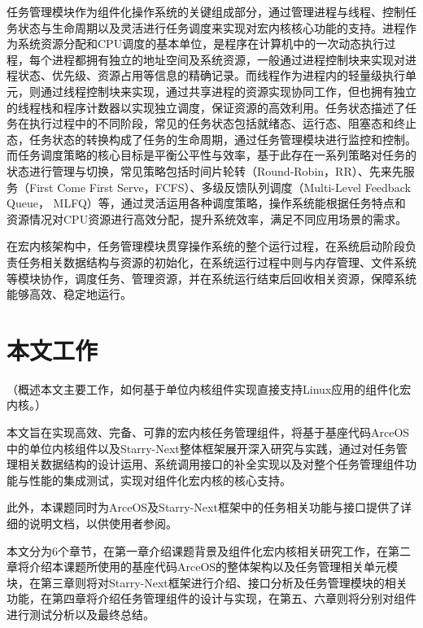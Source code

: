 任务管理模块作为组件化操作系统的关键组成部分，通过管理进程与线程、控制任务状态与生命周期以及灵活进行任务调度来实现对宏内核核心功能的支持。进程作为系统资源分配和CPU调度的基本单位，是程序在计算机中的一次动态执行过程，每个进程都拥有独立的地址空间及系统资源，一般通过进程控制块来实现对进程状态、优先级、资源占用等信息的精确记录。而线程作为进程内的轻量级执行单元，则通过线程控制块来实现，通过共享进程的资源实现协同工作，但也拥有独立的线程栈和程序计数器以实现独立调度，保证资源的高效利用。任务状态描述了任务在执行过程中的不同阶段，常见的任务状态包括就绪态、运行态、阻塞态和终止态，任务状态的转换构成了任务的生命周期，通过任务管理模块进行监控和控制。而任务调度策略的核心目标是平衡公平性与效率，基于此存在一系列策略对任务的状态进行管理与切换，常见策略包括时间片轮转（Round-Robin，RR）、先来先服务（First Come First Serve，FCFS）、多级反馈队列调度（Multi-Level Feedback Queue， MLFQ）等，通过灵活运用各种调度策略，操作系统能根据任务特点和资源情况对CPU资源进行高效分配，提升系统效率，满足不同应用场景的需求。

在宏内核架构中，任务管理模块贯穿操作系统的整个运行过程，在系统启动阶段负责任务相关数据结构与资源的初始化，在系统运行过程中则与内存管理、文件系统等模块协作，调度任务、管理资源，并在系统运行结束后回收相关资源，保障系统能够高效、稳定地运行。


\section{本文工作}

（概述本文主要工作，如何基于单位内核组件实现直接支持Linux应用的组件化宏内核。）

本文旨在实现高效、完备、可靠的宏内核任务管理组件，将基于基座代码ArceOS中的单位内核组件以及Starry-Next整体框架展开深入研究与实践，通过对任务管理相关数据结构的设计运用、系统调用接口的补全实现以及对整个任务管理组件功能与性能的集成测试，实现对组件化宏内核的核心支持。

此外，本课题同时为ArceOS及Starry-Next框架中的任务相关功能与接口提供了详细的说明文档，以供使用者参阅。

本文分为6个章节，在第一章介绍课题背景及组件化宏内核相关研究工作，在第二章将介绍本课题所使用的基座代码ArceOS的整体架构以及任务管理相关单元模块，在第三章则将对Starry-Next框架进行介绍、接口分析及任务管理模块的相关功能，在第四章将介绍任务管理组件的设计与实现，在第五、六章则将分别对组件进行测试分析以及最终总结。